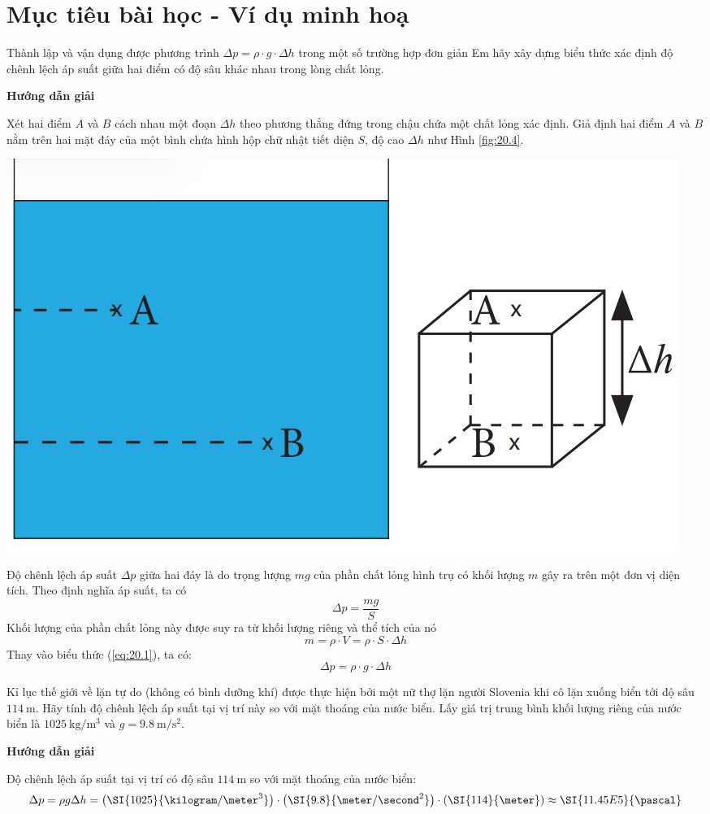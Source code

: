 \section{Mục tiêu bài học - Ví dụ minh hoạ}
\begin{dang}{Thành lập và vận dụng được phương trình $\Delta p=\rho\cdot g\cdot\Delta h$ trong một số trường hợp đơn giản}
	{Em hãy xây dựng biểu thức xác định độ chênh lệch áp suất giữa hai điểm có độ sâu khác nhau trong lòng chất lỏng.
}
{\begin{center}
		\textbf{Hướng dẫn giải}
	\end{center}
Xét hai điểm $A$ và $B$ cách nhau một đoạn $\Delta h$ theo phương thẳng đứng trong chậu chứa một chất lỏng xác định. Giả định hai điểm $A$ và $B$ nằm trên hai mặt đáy của một bình chứa hình hộp chữ nhật tiết diện $S$, độ cao $\Delta h$ như Hình \ref{fig:20.4}.
\begin{center}
	\includegraphics[width=0.3\linewidth]{../figs/VN10-2023-PH-TP020-4}
	\label{fig:20.4}
\end{center}
Độ chênh lệch áp suất $\Delta p$ giữa hai đáy là do trọng lượng $mg$ của phần chất lỏng hình trụ có khối lượng $m$ gây ra trên một đơn vị diện tích. Theo định nghĩa áp suất, ta có
\begin{equation}
	\Delta p =\dfrac{mg}{S}
	\label{eq:20.1}
\end{equation}
Khối lượng của phần chất lỏng này được suy ra từ khối lượng riêng và thể tích của nó
$$m=\rho\cdot V=\rho \cdot S\cdot\Delta h$$
Thay vào biểu thức (\ref{eq:20.1}), ta có:
$$\Delta p=\rho\cdot g\cdot \Delta h$$
}
{Kỉ lục thế giới về lặn tự do (không có bình dưỡng khí) được thực hiện bởi một nữ thợ lặn người Slovenia khi cô lặn xuống biển tới độ sâu $\SI{114}{\meter}$. Hãy tính độ chênh lệch áp suất tại vị trí này so với mặt thoáng của nước biển. Lấy giá trị trung bình khối lượng riêng của nước biển là $\SI{1025}{\kilogram/\meter^3}$ và $g=\SI{9.8}{\meter/\second^2}$.
}
{\begin{center}
		\textbf{Hướng dẫn giải}
	\end{center}
Độ chênh lệch áp suất tại vị trí có độ sâu $\SI{114}{\meter}$ so với mặt thoáng của nước biển:
$$\Delta p=\rho g\Delta h=\left(\SI{1025}{\kilogram/\meter^3}\right)\cdot\left(\SI{9.8}{\meter/\second^2}\right)\cdot\left(\SI{114}{\meter}\right)\approx\SI{11.45E5}{\pascal}$$
}
\end{dang}
